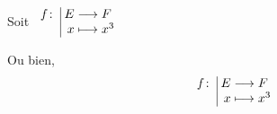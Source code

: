 \documentclass[10pt,a4paper]{article}
\makeatletter
\newcommand{\function}[5]{ %
		\begin{array}{l@{\;}|@{\;}r@{\;}c@{\;}l}
				#1 \colon & #2 & \longrightarrow & #3 \\
								 & #4 & \longmapsto & #5 %
		 \end{array}}
\makeatother
\begin{document}
	Soit $\function{f}{E}{F}{x}{x^3}$

	Ou bien,
	 \[ \function{f}{E}{F}{x}{x^3} \]
\end{document}
